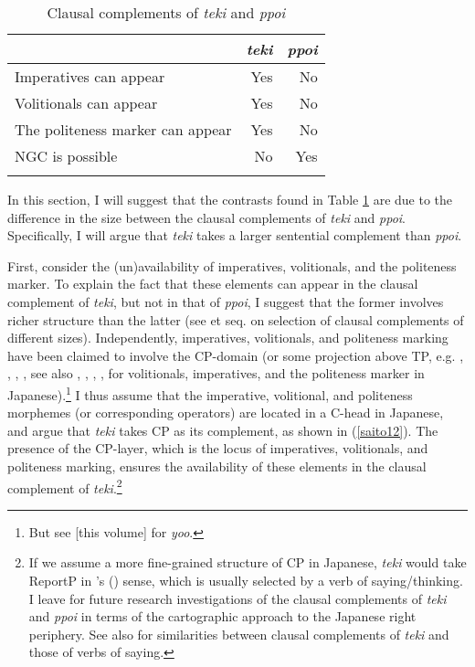\documentclass[output=paper]{langscibook}
\begin{document}
\begin{table}
\caption{Clausal complements of \emph{teki} and \emph{ppoi}}
\label{saitotab1}
 \begin{tabular}{l rr}
  \lsptoprule
  \multicolumn{1}{r@{}}{Clausal complements of:}     &     \emph{teki} & \emph{ppoi}\\
  \midrule
  Imperatives can appear  &   Yes  &    No     \\
  Volitionals can appear &   Yes &   No      \\
  The politeness marker can appear & Yes & No \\
  NGC is possible & No & Yes\\
  \lspbottomrule
 \end{tabular}
\end{table}

In this section, I will suggest that the contrasts found in Table \ref{saitotab1} are due to the difference in the size between the clausal complements of \emph{teki} and \emph{ppoi}. Specifically, I will argue that \emph{teki} takes a larger sentential complement than \emph{ppoi}. 

First, consider the (un)availability of imperatives, volitionals, and the politeness marker. To explain the fact that these elements can appear in the clausal complement of \emph{teki}, but not in that of \emph{ppoi}, I suggest that the former involves richer structure than the latter (see \citealt{wurmbrand2001} et seq. on selection of clausal complements of different sizes). Independently, imperatives, volitionals, and politeness marking have been claimed to involve the CP-domain (or some projection above TP, e.g. \citealt{rizzi1997}, \citealt{Han1998}, \citealt{cinque1999}, \citealt{Haegeman2006}, see also \citealt{Ueda2007,Ueda2007}, \citealt{Endo2009}, \citealt{Hasegawa2010}, \citealt{miyagawa2012a}, \citealt{Yoshimoto2017} for volitionals, imperatives, and the politeness marker in Japanese).\footnote{But see \citealt{shimamura2021} [this volume] for \emph{yoo}.} I thus assume that the imperative, volitional, and politeness morphemes (or corresponding operators) are located in a C-head in Japanese, and argue that \emph{teki} takes CP as its complement, as shown in (\ref{saito12}). The presence of the CP-layer, which is the locus of imperatives, volitionals, and politeness marking, ensures the availability of these elements in the clausal complement of \emph{teki}.\footnote{If we assume a more fine-grained structure of CP in Japanese, \emph{teki} would take ReportP in \citeauthor{Saito2012}'s (\citeyear{Saito2012}) sense, which is usually selected by a verb of saying/thinking. I leave for future research investigations of the clausal complements of \emph{teki} and \emph{ppoi} in terms of the cartographic approach to the Japanese right periphery. See also \citet{Saito2017} for similarities between clausal complements of \emph{teki} and those of verbs of saying.}
\end{document}
